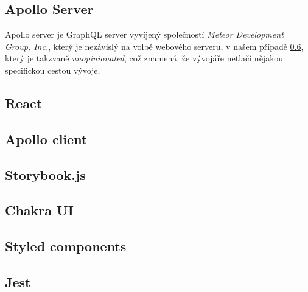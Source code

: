\subsection{Apollo Server}
\label{ss:apollo_server}
Apollo server je GraphQL server vyvíjený společností \emph{Meteor Development Group, Inc.}, který je nezávislý na volbě webového serveru, v našem případě \ref{ss:express}, který je takzvaně \emph{unopinionated}, což znamená, že vývojáře netlačí nějakou specifickou cestou vývoje.

\subsection{React}
\label{ss:react}

\subsection{Apollo client}
\label{ss:apollo_client}

\subsection{Storybook.js}
\label{ss:storybook}

\subsection{Chakra UI}
\label{ss:chakra_ui}

\subsection{Styled components}
\label{ss:express}

\subsection{Jest}
\label{ss:jest}
